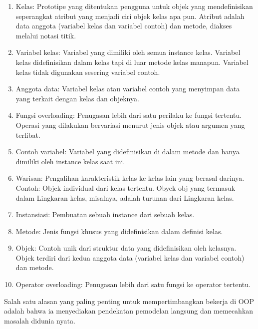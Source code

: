 \begin {enumerate}
\item Kelas: Prototipe yang ditentukan pengguna untuk objek yang mendefinisikan seperangkat atribut yang menjadi ciri objek kelas apa pun. Atribut adalah data anggota (variabel kelas dan variabel contoh) dan metode, diakses melalui notasi titik. 
\item Variabel kelas: Variabel yang dimiliki oleh semua instance kelas. Variabel kelas didefinisikan dalam kelas tapi di luar metode kelas manapun. Variabel kelas tidak digunakan sesering variabel contoh. 
\item Anggota data: Variabel kelas atau variabel contoh yang menyimpan data yang terkait dengan kelas dan objeknya. 
\item Fungsi overloading: Penugasan lebih dari satu perilaku ke fungsi tertentu. Operasi yang dilakukan bervariasi menurut jenis objek atau argumen yang terlibat.
\item Contoh variabel: Variabel yang didefinisikan di dalam metode dan hanya dimiliki oleh instance kelas saat ini.
\item Warisan: Pengalihan karakteristik kelas ke kelas lain yang berasal darinya. Contoh: Objek individual dari kelas tertentu. Obyek obj yang termasuk dalam Lingkaran kelas, misalnya, adalah turunan dari Lingkaran kelas. 
\item Instansiasi: Pembuatan sebuah instance dari sebuah kelas. 
\item Metode: Jenis fungsi khusus yang didefinisikan dalam definisi kelas.  
\item Objek: Contoh unik dari struktur data yang didefinisikan oleh kelasnya. Objek terdiri dari kedua anggota data (variabel kelas dan variabel contoh) dan metode.
\item Operator overloading: Penugasan lebih dari satu fungsi ke operator tertentu. 
\end{enumerate} 

Salah satu alasan yang paling penting untuk mempertimbangkan bekerja di OOP adalah bahwa ia menyediakan pendekatan pemodelan langsung dan memecahkan masalah didunia nyata. 

\vspace{12pt}
\noindent 
